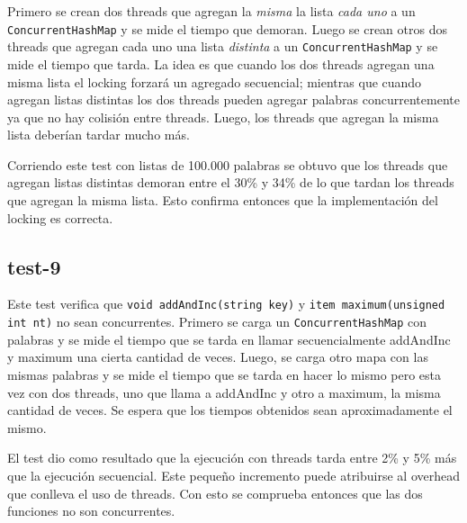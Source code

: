 Primero se crean dos threads que agregan la \emph{misma} la lista \emph{cada uno} a un \texttt{ConcurrentHashMap} y se mide el tiempo que demoran. Luego se crean otros dos threads que agregan cada uno una lista \emph{distinta} a un \texttt{ConcurrentHashMap} y se mide el tiempo que tarda. La idea es que cuando los dos threads agregan una misma lista el locking forzará un agregado secuencial; mientras que cuando agregan listas distintas los dos threads pueden agregar palabras concurrentemente ya que no hay colisión entre threads. Luego, los threads que agregan la misma lista deberían tardar mucho más.

Corriendo este test con listas de 100.000 palabras se obtuvo que los threads que agregan listas distintas demoran entre el 30\% y 34\% de lo que tardan los threads que agregan la misma lista. Esto confirma entonces que la implementación del locking es correcta.


\subsection{test-9}

Este test verifica que \texttt{void addAndInc(string key)} y \texttt{item maximum(unsigned int nt)} no sean concurrentes. Primero se carga un \texttt{ConcurrentHashMap} con palabras y se mide el tiempo que se tarda en llamar secuencialmente addAndInc y maximum una cierta cantidad de veces. Luego, se carga otro mapa con las mismas palabras y se mide el tiempo que se tarda en hacer lo mismo pero esta vez con dos threads, uno que llama a addAndInc y otro a maximum, la misma cantidad de veces. Se espera que los tiempos obtenidos sean aproximadamente el mismo.

El test dio como resultado que la ejecución con threads tarda entre 2\% y 5\% más que la ejecución secuencial. Este pequeño incremento puede atribuirse al overhead que conlleva el uso de threads. Con esto se comprueba entonces que las dos funciones no son concurrentes.


